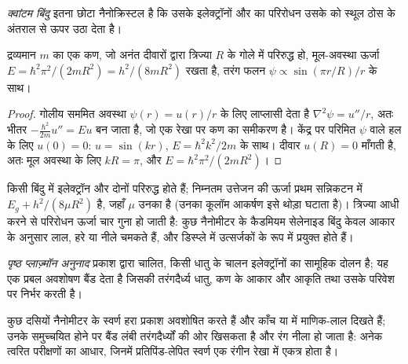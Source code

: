 \begin{definition}[क्वांटम बिंदु]\label{def:b3:inorganic-materials:quantum-dot}
\emph{क्वांटम बिंदु} इतना छोटा  नैनोक्रिस्टल है
कि उसके इलेक्ट्रॉनों और  का परिरोधन उसके  को
स्थूल ठोस के अंतराल से ऊपर उठा देता है।
\end{definition}

\begin{theorem}[गोले में परिरोधन]\label{thm:b3:inorganic-materials:quantum-dot}
द्रव्यमान $m$ का एक कण, जो अनंत दीवारों द्वारा त्रिज्या $R$ के गोले में परिरुद्ध हो,
मूल-अवस्था ऊर्जा $E = \hbar^2\pi^2/(2mR^2) = h^2/(8mR^2)$ रखता है, तरंग फलन $\psi \propto \sin(\pi r/R)/r$ के साथ।
\end{theorem}

\begin{proof}
गोलीय सममित अवस्था $\psi(r) = u(r)/r$ के लिए लाप्लासी देता है
$\nabla^2\psi = u''/r$, अतः भीतर  $-\frac{\hbar^2}{2m}u'' = Eu$ बन जाता है, जो एक रेखा पर
कण का समीकरण है। केंद्र पर परिमित $\psi$ वाले हल के लिए $u(0) = 0$: $u = \sin(kr)$, $E = \hbar^2k^2/2m$ के साथ।
दीवार $u(R) = 0$ माँगती है, अतः मूल अवस्था के लिए $kR = \pi$, और $E = \hbar^2\pi^2/(2mR^2)$।
\end{proof}

किसी बिंदु में इलेक्ट्रॉन और  दोनों परिरुद्ध होते हैं; निम्नतम
उत्तेजन की ऊर्जा प्रथम सन्निकटन में $E_g + h^2/(8\mu R^2)$ है, जहाँ $\mu$ उनका  है (उनका कूलॉम आकर्षण इसे थोड़ा घटाता है)। त्रिज्या आधी करने से
परिरोधन ऊर्जा चार गुना हो जाती है: कुछ नैनोमीटर के कैडमियम सेलेनाइड बिंदु
केवल आकार के अनुसार लाल, हरे या नीले चमकते हैं, और डिस्प्ले में
उत्सर्जकों के रूप में प्रयुक्त होते हैं।

\begin{definition}[पृष्ठ प्लाज़्मॉन अनुनाद]\label{def:b3:inorganic-materials:plasmon}
\emph{पृष्ठ प्लाज़्मॉन अनुनाद} प्रकाश द्वारा चालित,
किसी धातु  के चालन इलेक्ट्रॉनों का सामूहिक दोलन है; यह एक प्रबल अवशोषण बैंड देता है जिसकी तरंगदैर्ध्य
धातु, कण के आकार और आकृति तथा उसके परिवेश पर निर्भर करती है।
\end{definition}

कुछ दसियों नैनोमीटर के स्वर्ण  हरा प्रकाश अवशोषित करते हैं और काँच या  में
माणिक-लाल दिखते हैं; उनके समुच्चयित होने पर बैंड लंबी
तरंगदैर्ध्यों की ओर खिसकता है और रंग नीला हो जाता है: अनेक त्वरित परीक्षणों का आधार, जिनमें
प्रतिपिंड-लेपित स्वर्ण  एक रंगीन रेखा में एकत्र होता है।

